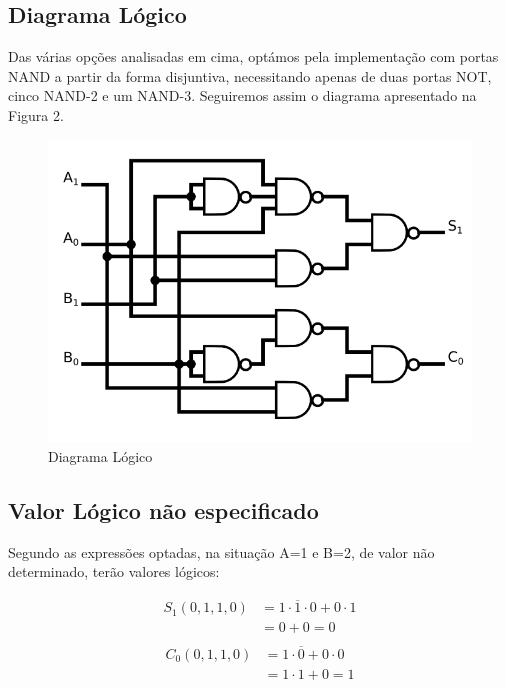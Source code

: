 \documentclass[a4paper,12pt]{article}
\begin{document}
\subsection{Diagrama Lógico}

Das várias opções analisadas em cima, optámos pela implementação com portas NAND a partir da forma disjuntiva, necessitando apenas de duas portas NOT, cinco NAND-2 e um NAND-3. Seguiremos assim o diagrama apresentado na Figura 2.
\begin{figure}[h]
\caption{Diagrama Lógico}
\begin{center}
\includegraphics[scale=0.45]{SD_logi.png}
\end{center}
\end{figure}

\subsection{Valor Lógico não especificado}

Segundo as expressões optadas, na situação A=1 e B=2, de valor não determinado, terão valores lógicos:

\begin{equation}
\begin{split}
S_1(0,1,1,0) & = 1\cdot\overline{1}\cdot0 + 0\cdot1\\
                     & = 0 + 0 = 0  \\  
\end{split}
\end{equation}
\begin{equation}
\begin{split}
C_0(0,1,1,0) & = 1\cdot\overline{0} + 0\cdot0 \\
                     & = 1\cdot1 + 0 = 1  \\   
\end{split}
\end{equation}
\end{document}
